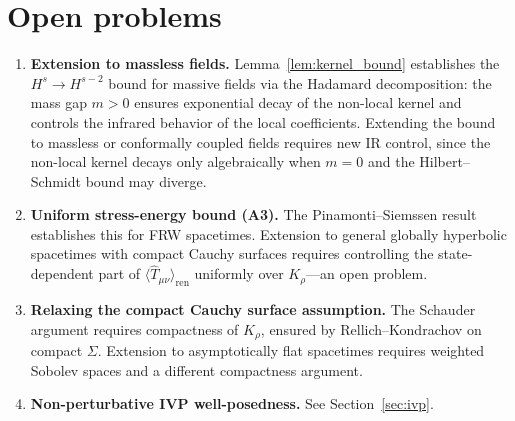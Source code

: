 \documentclass[12pt,a4paper]{article}
\begin{document}
\section{Open problems}
\label{sec:open}

\begin{enumerate}

\item \textbf{Extension to massless fields.}
Lemma~\ref{lem:kernel_bound} establishes the $H^s \to H^{s-2}$ bound for massive fields
via the Hadamard decomposition: the mass gap $m > 0$ ensures exponential decay of the
non-local kernel and controls the infrared behavior of the local coefficients. Extending
the bound to massless or conformally coupled fields requires new IR control, since the
non-local kernel decays only algebraically when $m = 0$ and the Hilbert--Schmidt bound
may diverge.

\item \textbf{Uniform stress-energy bound (A3).} The Pinamonti--Siemssen
result~\cite{pinamonti_siemssen} establishes this for FRW spacetimes. Extension to general
globally hyperbolic spacetimes with compact Cauchy surfaces requires controlling the
state-dependent part of $\langle\hat{T}_{\mu\nu}\rangle_{\text{ren}}$ uniformly over
$K_\rho$---an open problem.

\item \textbf{Relaxing the compact Cauchy surface assumption.} The Schauder argument
requires compactness of $K_\rho$, ensured by Rellich--Kondrachov on compact $\Sigma$.
Extension to asymptotically flat spacetimes requires weighted Sobolev spaces and a
different compactness argument.

\item \textbf{Non-perturbative IVP well-posedness.} See Section~\ref{sec:ivp}.

\end{enumerate}
\end{document}
